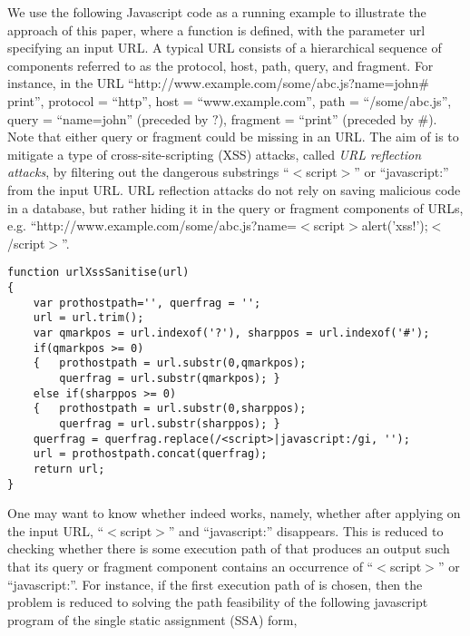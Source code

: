 We use the following Javascript code as a running example to illustrate the approach of this paper, where a function {\urlxsssanitise} is defined, with the parameter url specifying an input URL. A typical URL consists of a hierarchical sequence of components referred to as the protocol, host, path, query, and fragment. For instance, in the URL ``http://www.example.com/some/abc.js?name=john$\#$print'', protocol = ``http'', host = ``www.example.com'', path = ``/some/abc.js'', query = ``name=john'' (preceded by $?$), fragment = ``print'' (preceded by $\#$). Note that either query or fragment could be missing in an URL. The aim of {\urlxsssanitise} is to mitigate a type of cross-site-scripting (XSS) attacks, called \emph{URL reflection attacks}, by filtering out the dangerous substrings ``$<$script$>$'' or ``javascript:'' from the input URL. URL reflection attacks  do not rely on saving malicious code in a database, but rather hiding it in the query or fragment components of URLs, e.g. ``http://www.example.com/some/abc.js?name=$<$script$>$alert('xss!');$<$/script$>$''.
{\small
\begin{verbatim}
function urlXssSanitise(url)
{
    var prothostpath='', querfrag = '';
    url = url.trim();
    var qmarkpos = url.indexof('?'), sharppos = url.indexof('#');
    if(qmarkpos >= 0) 
    {   prothostpath = url.substr(0,qmarkpos);
        querfrag = url.substr(qmarkpos); }
    else if(sharppos >= 0)
    {   prothostpath = url.substr(0,sharppos);
        querfrag = url.substr(sharppos); }
    querfrag = querfrag.replace(/<script>|javascript:/gi, '');
    url = prothostpath.concat(querfrag);
    return url;
}
\end{verbatim}
}


One may want to know whether {\urlxsssanitise} indeed works, namely, whether after applying {\urlxsssanitise} on the input URL, ``$<$script$>$'' and ``javascript:'' disappears.  This is reduced to checking whether there is some execution path of {\urlxsssanitise} that produces an output such that its query or fragment component contains an occurrence of ``$<$script$>$'' or ``javascript:''. For instance, if the first execution path of {\urlxsssanitise} is chosen, then the problem is reduced to solving the path feasibility of the following javascript program of the single static assignment (SSA) form,

